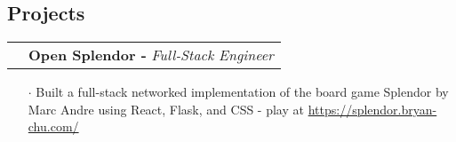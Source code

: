 \documentclass[a4paper, oneside, final]{scrartcl} %
\newcommand{\gray}{\rowcolor[gray]{.90}} %
\begin{document}
\begin{center}
  \vspace{-0.4cm}

  \section{Projects}
  \renewcommand{\arraystretch}{1.3}






  \vspace{-0.05cm}

  \begin{tabularx}{1.00\linewidth}{>{\raggedleft\scshape}p{0cm}X}
    \gray & \textbf{Open Splendor -} \textit{Full-Stack Engineer}\\
  \end{tabularx}
  \begin{itemize}\itemsep-0.2cm
      \vspace{-0.1cm}
    \item[$\cdot$] Built a full-stack networked implementation of the board game Splendor by Marc Andre using React, Flask, and CSS - play at \href{https://splendor.bryan-chu.com/}{https://splendor.bryan-chu.com/}	 \\
  \end{itemize}


\end{center}
\end{document}
